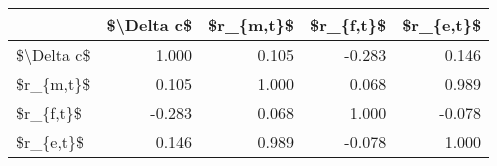 \begin{tabular}{lrrrr}
\toprule
{} &  \$\textbackslash Delta c\$ &  \$r\_\{m,t\}\$ &  \$r\_\{f,t\}\$ &  \$r\_\{e,t\}\$ \\
\midrule
\$\textbackslash Delta c\$ &       1.000 &      0.105 &     -0.283 &      0.146 \\
\$r\_\{m,t\}\$  &       0.105 &      1.000 &      0.068 &      0.989 \\
\$r\_\{f,t\}\$  &      -0.283 &      0.068 &      1.000 &     -0.078 \\
\$r\_\{e,t\}\$  &       0.146 &      0.989 &     -0.078 &      1.000 \\
\bottomrule
\end{tabular}
